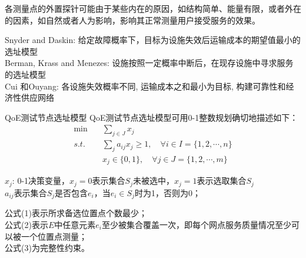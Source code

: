 \documentclass[10pt]{beamer}
\begin{document}
\begin{frame}
  各测量点的外置探针可能由于某些内在的原因，如结构简单、能量有限，或者外在的因素，如自然或者人为影响，影响其正常测量用户接受服务的效果。

Snyder and Daskin: 给定故障概率下，目标为设施失效后运输成本的期望值最小的选址模型\\
Berman, Krass and Menezes: 设施按照一定概率中断后，在现存设施中寻求服务的选址模型\\
Cui 和Ouyang: 各设施失效概率不同, 运输成本之和最小为目标, 构建可靠性和经济性供应网络\\
\end{frame}
\begin{frame}
\begin{block}{QoE测试节点选址模型}
  QoE测试节点选址模型可用0-1整数规划确切地描述如下：
\begin{align}
\min \quad& \sum_{j\in J}x_j \\
s.t. \quad& \sum_j a_{ij}x_j\geqslant 1, \quad \forall i\in I=\{1,2,\cdots,n\}\\
& x_j \in \{0,1\},\quad \forall j\in J=\{1,2,\cdots,m\}
\end{align}
\end{block}
$x_j$: 0-1决策变量，$x_j=0$表示集合$S_j$未被选中，$x_j=1$表示选取集合$S_j$\\
$a_{ij}$表示集合$S_j$是否包含$e_i$，当$e_i\in S_j$时为1，否则为0；

公式(1)表示所求备选位置点个数最少；\\
公式(2)表示$E$中任意元素$e_i$至少被集合覆盖一次，即每个网点服务质量情况至少可以被一个位置点测量；\\
公式(3)为完整性约束。
\end{frame}
\end{document}
